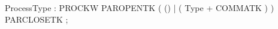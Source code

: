 %
%
%
\begin{rail}
ProcessType : PROCKW PAROPENTK ( () | ( Type + COMMATK ) ) PARCLOSETK ;
\end{rail}
